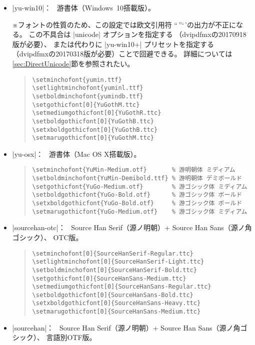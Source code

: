 \documentclass[uplatex,dvipdfmx,a4paper]{jsarticle}
\newcommand{\Note}{\par\noindent ※}
\newcommand{\Means}{：\ }
\begin{document}
\begin{itemize}
\item |yu-win10|\Means
  游書体（Windows~10搭載版）。
  \Note フォントの性質のため、この設定では欧文引用符
  “\,”‘\,’の出力が不正になる。
  この不具合は |unicode| オプションを指定する
  （dvipdfmxの20170918版が必要）、
  または代わりに |yu-win10+| プリセットを指定する
  （dvipdfmxの20170318版が必要）ことで回避できる。
  詳細については\ref{sec:DirectUnicode}節を参照されたい。

\begin{quote}\small\begin{verbatim}
\setminchofont{yumin.ttf}
\setlightminchofont{yuminl.ttf}
\setboldminchofont{yumindb.ttf}
\setgothicfont[0]{YuGothM.ttc}
\setmediumgothicfont[0]{YuGothR.ttc}
\setboldgothicfont[0]{YuGothB.ttc}
\setxboldgothicfont[0]{YuGothB.ttc}
\setmarugothicfont[0]{YuGothM.ttc}
\end{verbatim}\end{quote}

\item |yu-osx|\Means
  游書体（Mac OS X搭載版）。
\begin{quote}\small\begin{verbatim}
\setminchofont{YuMin-Medium.otf}       % 游明朝体 ミディアム
\setboldminchofont{YuMin-Demibold.ttf} % 游明朝体 デミボールド
\setgothicfont{YuGo-Medium.otf}        % 游ゴシック体 ミディアム
\setboldgothicfont{YuGo-Bold.otf}      % 游ゴシック体 ボールド
\setxboldgothicfont{YuGo-Bold.otf}     % 游ゴシック体 ボールド
\setmarugothicfont{YuGo-Medium.otf}    % 游ゴシック体 ミディアム
\end{verbatim}\end{quote}

\item |sourcehan-otc|\Means
  Source Han Serif（源ノ明朝）+ Source Han Sans（源ノ角ゴシック）、
  OTC版。

\begin{quote}\small\begin{verbatim}
\setminchofont[0]{SourceHanSerif-Regular.ttc}
\setlightminchofont[0]{SourceHanSerif-Light.ttc}
\setboldminchofont[0]{SourceHanSerif-Bold.ttc}
\setgothicfont[0]{SourceHanSans-Medium.ttc}
\setmediumgothicfont[0]{SourceHanSans-Regular.ttc}
\setboldgothicfont[0]{SourceHanSans-Bold.ttc}
\setxboldgothicfont[0]{SourceHanSans-Heavy.ttc}
\setmarugothicfont[0]{SourceHanSans-Medium.ttc}
\end{verbatim}\end{quote}

\item |sourcehan|\Means
  Source Han Serif（源ノ明朝）+ Source Han Sans（源ノ角ゴシック）、
  言語別OTF版。


\end{itemize}
\end{document}

